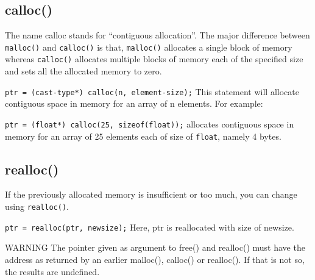 \documentclass[11pt,a4paper]{article}
\begin{document}
\subsection*{calloc()}
The name calloc stands for ``contiguous allocation''. The major difference between \texttt{malloc()} and \texttt{calloc()} is that, \texttt{malloc()} allocates a single block of memory whereas \texttt{calloc()} allocates multiple blocks of memory each of the specified size and sets all the allocated memory to zero. 

\texttt{ptr = (cast-type*) calloc(n, element-size);}  This statement will allocate contiguous space in memory for an array of n elements. For example:

 \lstinline!ptr = (float*) calloc(25, sizeof(float));! allocates contiguous space in memory for an array of 25 elements each of size of \lstinline!float!, namely 4 bytes.

\subsection*{realloc()} 

If the previously allocated memory is insufficient or too much,  you can change using \texttt{realloc()}. 

\texttt{ptr = realloc(ptr, newsize);} Here, ptr is reallocated with size of newsize.

\begin{bclogo}[couleur=blue!5, arrondi=0.3, logo=\bcbombe]{WARNING}
The pointer given as argument to free() and realloc() must have the address as returned by an earlier malloc(), calloc() or realloc(). If that is not so, the results are undefined.
\end{bclogo}
\end{document}
